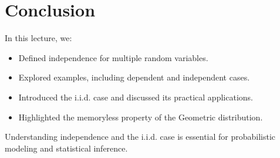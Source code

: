 \documentclass{article}
\begin{document}
\section*{Conclusion}

In this lecture, we:
\begin{itemize}
  \item Defined independence for multiple random variables.
  \item Explored examples, including dependent and independent cases.
  \item Introduced the i.i.d. case and discussed its practical applications.
  \item Highlighted the memoryless property of the Geometric distribution.
\end{itemize}

Understanding independence and the i.i.d. case is essential for probabilistic modeling and statistical inference.
\end{document}
